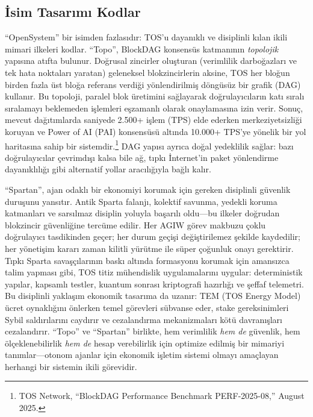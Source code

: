 \documentclass[11pt]{article}
\begin{document}
\subsection{İsim Tasarımı Kodlar}
``OpenSystem'' bir isimden fazlasıdır: TOS'u dayanıklı ve disiplinli kılan ikili mimari ilkeleri kodlar. ``Topo'', BlockDAG konsensüs katmanının \emph{topolojik} yapısına atıfta bulunur. Doğrusal zincirler oluşturan (verimlilik darboğazları ve tek hata noktaları yaratan) geleneksel blokzincirlerin aksine, TOS her bloğun birden fazla üst bloğa referans verdiği yönlendirilmiş döngüsüz bir grafik (DAG) kullanır. Bu topoloji, paralel blok üretimini sağlayarak doğrulayıcıların katı sıralı sıralamayı beklemeden işlemleri eşzamanlı olarak onaylamasına izin verir. Sonuç, mevcut dağıtımlarda saniyede 2.500+ işlem (TPS) elde ederken merkeziyetsizliği koruyan ve Power of AI (PAI) konsensüsü altında 10.000+ TPS'ye yönelik bir yol haritasına sahip bir sistemdir.\footnote{TOS Network, ``BlockDAG Performance Benchmark PERF-2025-08,'' August 2025.} DAG yapısı ayrıca doğal yedeklilik sağlar: bazı doğrulayıcılar çevrimdışı kalsa bile ağ, tıpkı İnternet'in paket yönlendirme dayanıklılığı gibi alternatif yollar aracılığıyla bağlı kalır.

``Spartan'', ajan odaklı bir ekonomiyi korumak için gereken disiplinli güvenlik duruşunu yansıtır. Antik Sparta falanjı, kolektif savunma, yedekli koruma katmanları ve sarsılmaz disiplin yoluyla başarılı oldu---bu ilkeler doğrudan blokzincir güvenliğine tercüme edilir. Her AGIW görev makbuzu çoklu doğrulayıcı tasdikinden geçer; her durum geçişi değiştirilemez şekilde kaydedilir; her yönetişim kararı zaman kilitli yürütme ile süper çoğunluk onayı gerektirir. Tıpkı Sparta savaşçılarının baskı altında formasyonu korumak için amansızca talim yapması gibi, TOS titiz mühendislik uygulamalarını uygular: deterministik yapılar, kapsamlı testler, kuantum sonrası kriptografi hazırlığı ve şeffaf telemetri. Bu disiplinli yaklaşım ekonomik tasarıma da uzanır: TEM (TOS Energy Model) ücret oynaklığını önlerken temel görevleri sübvanse eder, stake gereksinimleri Sybil saldırılarını caydırır ve cezalandırma mekanizmaları kötü davranışları cezalandırır. ``Topo'' ve ``Spartan'' birlikte, hem verimlilik \emph{hem de} güvenlik, hem ölçeklenebilirlik \emph{hem de} hesap verebilirlik için optimize edilmiş bir mimariyi tanımlar---otonom ajanlar için ekonomik işletim sistemi olmayı amaçlayan herhangi bir sistemin ikili görevidir.
\end{document}
